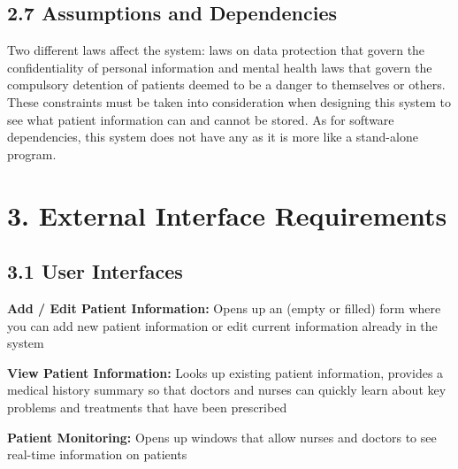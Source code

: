 \documentclass[12pt]{article}
\renewcommand{\_}{\kern-1.5pt\textunderscore\kern-1.5pt}
\begin{document}
\setlength{\parskip}{3.96pt}
\subsection*{2.7 \hspace*{10pt}Assumptions and Dependencies}
Two different laws affect the system: laws on data protection that govern the confidentiality of personal information and mental health laws that govern the compulsory detention of patients deemed to be a danger to themselves or others. These constraints must be taken into consideration when designing this system to see what patient information can and cannot be stored. As for software dependencies, this system does not have any as it is more like a stand-alone program.\par

\section*{3. \hspace*{10pt}External Interface Requirements}
\subsection*{3.1 \hspace*{10pt}User Interfaces}

\vspace{\baselineskip}
\textbf{Add / Edit Patient Information: }Opens up an (empty or filled) form where you can add new patient information or edit current information already in the system\par


\vspace{\baselineskip}
\textbf{View Patient Information: }Looks up existing patient information, provides a medical history summary so that doctors and nurses can quickly learn about key problems and treatments that have been prescribed\par


\vspace{\baselineskip}
\textbf{Patient Monitoring: }Opens up windows that allow nurses and doctors to see real-time information on patients\par
\end{document}
